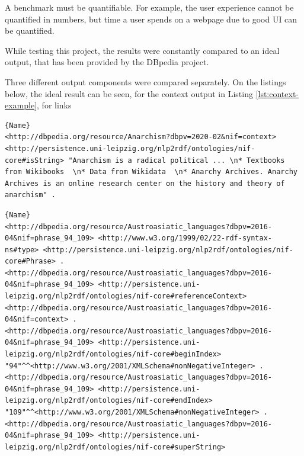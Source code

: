 \documentclass[thesis=M,english,hidelinks]{FITthesis}[2019/12/23]
\begin{document}
A benchmark must be quantifiable. For example, the user experience cannot be quantified in numbers, but time a user spends on a webpage due to good UI can be quantified.

While testing this project, the results were constantly compared to an ideal output, that has been provided by the DBpedia project\cite{dbpedia_url}.

Three different output components were compared separately. On the listings below, the ideal result can be seen, for the context output in Listing \ref{lst:context-example}, for links 

\begin{lstlisting}[caption=Exemplary result for NIF Context,frame=tlrb,  label = {lst:context-example}]{Name}
<http://dbpedia.org/resource/Anarchism?dbpv=2020-02&nif=context> <http://persistence.uni-leipzig.org/nlp2rdf/ontologies/nif-core#isString> "Anarchism is a radical political ... \n* Textbooks from Wikibooks  \n* Data from Wikidata  \n* Anarchy Archives. Anarchy Archives is an online research center on the history and theory of anarchism" .
\end{lstlisting}

\begin{lstlisting}[caption=Exemplary result for NIF Links,frame=tlrb,  label = {lst:links-example}]{Name}
<http://dbpedia.org/resource/Austroasiatic_languages?dbpv=2016-04&nif=phrase_94_109> <http://www.w3.org/1999/02/22-rdf-syntax-ns#type> <http://persistence.uni-leipzig.org/nlp2rdf/ontologies/nif-core#Phrase> .
<http://dbpedia.org/resource/Austroasiatic_languages?dbpv=2016-04&nif=phrase_94_109> <http://persistence.uni-leipzig.org/nlp2rdf/ontologies/nif-core#referenceContext> <http://dbpedia.org/resource/Austroasiatic_languages?dbpv=2016-04&nif=context> .
<http://dbpedia.org/resource/Austroasiatic_languages?dbpv=2016-04&nif=phrase_94_109> <http://persistence.uni-leipzig.org/nlp2rdf/ontologies/nif-core#beginIndex> "94"^^<http://www.w3.org/2001/XMLSchema#nonNegativeInteger> .
<http://dbpedia.org/resource/Austroasiatic_languages?dbpv=2016-04&nif=phrase_94_109> <http://persistence.uni-leipzig.org/nlp2rdf/ontologies/nif-core#endIndex> "109"^^<http://www.w3.org/2001/XMLSchema#nonNegativeInteger> .
<http://dbpedia.org/resource/Austroasiatic_languages?dbpv=2016-04&nif=phrase_94_109> <http://persistence.uni-leipzig.org/nlp2rdf/ontologies/nif-core#superString>
\end{lstlisting}
\end{document}
